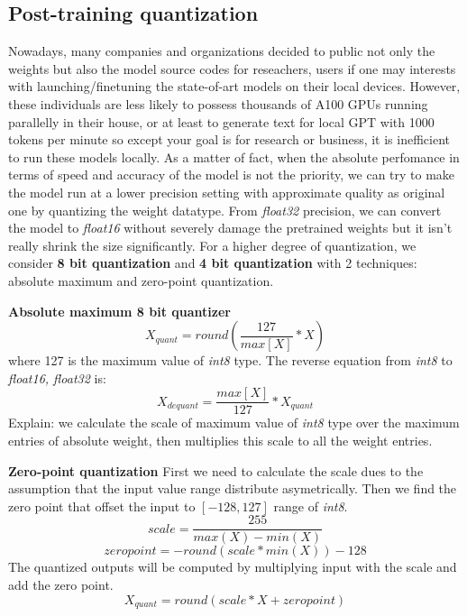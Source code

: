 \subsection{Post-training quantization}
Nowadays, many companies and organizations decided to public not only the weights but also the model source codes for reseachers, users if one may interests with launching/finetuning the state-of-art models on their local devices. However, these individuals are less likely to possess thousands of A100 GPUs running parallelly in their house, or at least to generate text for local GPT with 1000 tokens per minute so except your goal is for research or business, it is inefficient to run these models locally. As a matter of fact, when the absolute perfomance in terms of speed and accuracy of the model is not the priority, we can try to make the model run at a lower precision setting with approximate quality as original one by quantizing the weight datatype. From \textit{float32} precision, we can convert the model to \textit{float16} without severely damage the pretrained weights but it isn't really shrink the size significantly. For a higher degree of quantization, we consider \textbf{8 bit quantization} and \textbf{4 bit quantization} with 2 techniques: absolute maximum and zero-point quantization.\newline

\textbf{Absolute maximum 8 bit quantizer}\newline
\begin{equation}
    X_{quant} = round \left( \frac{127}{max[X]}*X \right)  
\end{equation}
where 127 is the maximum value of \textit{int8} type. The reverse equation from \textit{int8} to \textit{float16, float32} is:
\begin{equation}
    X_{dequant} =  \frac{max[X]}{127}*X_{quant}
\end{equation}
Explain: we calculate the scale of maximum value of \textit{int8} type over the maximum entries of absolute weight, then multiplies this scale to all the weight entries.\newline



\noindent
\textbf{Zero-point quantization}\newline\noindent
First we need to calculate the scale dues to the assumption that the input value range distribute asymetrically. Then we find the zero point that offset the input to $[-128,127]$ range of \textit{int8}.
\begin{equation}
    scale = \frac{255}{max(X) - min(X)}
\end{equation}
\begin{equation}
    zeropoint = -round(scale*min(X)) - 128
\end{equation}
The quantized outputs will be computed by multiplying input with the scale and add the zero point.
\begin{equation}
    X_{quant} = round(scale*X + zeropoint)
\end{equation}

